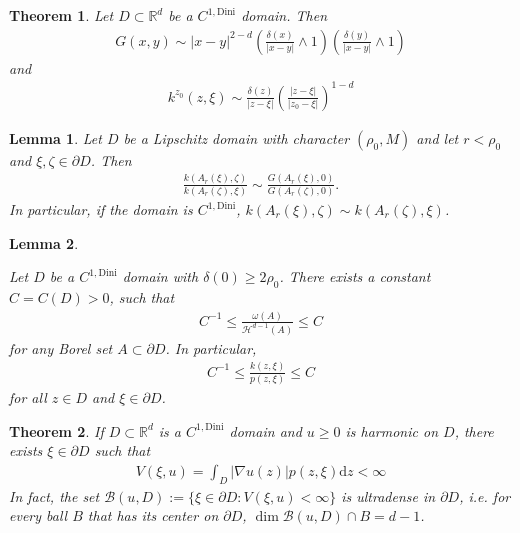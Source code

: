 \documentclass[10pt,a4paper]{amsart}
\newtheorem{theorem}{Theorem}
\newtheorem{lemma}{Lemma}
\begin{document}
	\begin{theorem}\label{thm:BogdanLD}
		Let $D\subset\mathbb R^d$ be a $C^{1,\mathrm{Dini}}$ domain. Then
		\begin{align}\label{eq:GreenFuncEstLD}
			G(x,y)\sim|x-y|^{2-d}\left(\frac{\delta(x)}{|x-y|}\wedge 1\right)\left(\frac{\delta(y)}{|x-y|}\wedge 1\right)
		\end{align}
		and
		\begin{align}\label{eq:MartinKernelDiniDom}
			k^{z_0}(z,\xi)\sim\frac{\delta(z)}{|z-\xi|}\left(\frac{|z-\xi|}{|z_0-\xi|}\right)^{1-d}
		\end{align}
	\end{theorem}

	\begin{lemma}\label{lem:quasisymm}
		Let $D$ be a Lipschitz domain with character $(\rho_0,M)$ and let $r<\rho_0$ and $\xi,\zeta\in\partial D$. Then
		\begin{align*}
			\frac{k(A_r(\xi),\zeta)}{k(A_r(\zeta),\xi)}\sim\frac{G(A_r(\xi),0)}{G(A_r(\zeta),0)}.
		\end{align*}
		In particular, if the domain is $C^{1,\mathrm{Dini}}$, $k(A_r(\xi),\zeta)\sim k(A_r(\zeta),\xi)$.
	\end{lemma}

	\begin{lemma}\label{lem:harmeasVShausdorff}
		
		Let $D$ be a $C^{1,\mathrm{Dini}}$ domain with $\delta(0)\geq 2\rho_0$. There exists a constant $C=C(D)>0$, such that
		\begin{align}\label{eq:EquivalenceOfMeasures}
			C^{-1}\leq\frac{\omega(A)}{\mathcal{H}^{d-1}(A)}\leq C
		\end{align}
		for any Borel set $A\subset\partial D$.
		In particular, 
		\begin{align*}
			C^{-1}\leq\frac{k(z,\xi)}{p(z,\xi)}\leq C
		\end{align*}
		for all $z\in D$ and $\xi\in\partial D$.
	\end{lemma}

	\begin{theorem}\label{thm:MainThm1}
		If $D\subset\mathbb R^d$ is a $C^{1,\mathrm{Dini}}$ domain and $u\geq0$ is harmonic on $D$, there exists $\xi\in\partial D$ such that 
		\begin{align}\label{eq:FullVar}
			V(\xi,u)=\int_D|\nabla u(z)|p(z,\xi)\mathrm{d}z<\infty
		\end{align}
		In fact, the set $\mathcal B(u, D):=\lbrace\xi\in\partial D: V(\xi,u)<\infty\rbrace$ is ultradense in $\partial D$, i.e. for every ball $B$ that has its center on $\partial D$, $\dim \mathcal{B}(u,D)\cap B=d-1$.	
	\end{theorem}
\end{document}
